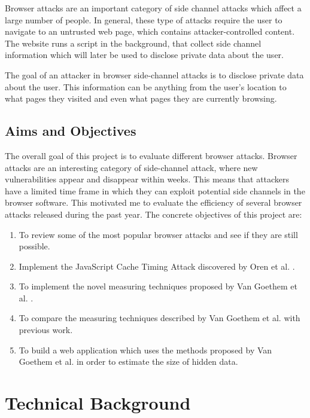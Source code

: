 \documentclass[10pt,a4paper,twoside]{book}
\begin{document}
Browser attacks are an important category of side channel attacks which affect a large number of people. In general, these type of attacks require the user to navigate to an untrusted web page, which contains attacker-controlled content. The website runs a script in the background, that collect side channel information which will later be used to disclose private data about the user. 

The goal of an attacker in browser side-channel attacks is to disclose private data about the user. This information can be anything from the user's location to what pages they visited and even what pages they are currently browsing.

\section{Aims and Objectives}
The overall goal of this project is to evaluate different browser attacks. Browser attacks are an interesting category of side-channel attack, where new vulnerabilities appear and disappear within weeks. This means that attackers have a limited time frame in which they can exploit potential side channels in the browser software. This motivated me to evaluate the efficiency of several browser attacks released during the past year. The concrete objectives of this project are:
\begin{enumerate}
\item To review some of the most popular browser attacks and see if they are still possible.
\item Implement the JavaScript Cache Timing Attack discovered by Oren et al. \cite{oren2015spy}.
\item To implement the novel measuring techniques proposed by Van Goethem et al. \cite{van2015clock}.
\item To compare the measuring techniques described by Van Goethem et al. \cite{van2015clock} with previous work.
\item To build a web application which uses the methods proposed by Van Goethem et al. \cite{van2015clock} in order to estimate the size of hidden data.
\end{enumerate}


\chapter{Technical Background}
\label{chap:technical}
\end{document}
